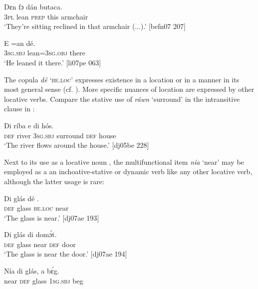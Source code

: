 \ea%
    \label{ex:key:935}
    \gll Dɛn      fɔ  dán  butaca.\\
\textsc{3pl}  lean    \textsc{prep}  this  armchair\\

\glt ‘They’re sitting reclined in that armchair (...).’ [befn07 207]\\
\z

\ea%
    \label{ex:key:936}
    \gll E    =an    dé.\\
\textsc{3sg.sbj}  lean=\textsc{3sg.obj}  there\\

\glt ‘He leaned it there.’ [li07pe 063]
\z

The copula \textit{dé} \textsc{‘be.loc’} expresses existence in a location or in a manner in its most general sense (cf. ). More specific nuances of location are expressed by other locative verbs. Compare the stative use of \textit{ráwn} ‘surround’ in the intransitive clause in :


\ea%
    \label{ex:key:937}
    \gll Di  ríba    e        di  hós.\\
\textsc{def}  river  \textsc{3sg.sbj}  surround  \textsc{def}  house\\

\glt ‘The river flows around the house.’ [dj05be 228]
\z

Next to its use as a locative noun , the multifunctional item \textit{nía} ‘near’ may be employed as a an inchoative-stative  or dynamic verb  like any other locative verb, although the latter usage is rare: 


\ea%
    \label{ex:key:938}
    \gll Di  glás    dé    .\\
\textsc{def}  glass  \textsc{be.loc}  near\\
\glt ‘The glass is near.’ [dj07ae 193]\\
\z

\ea%
    \label{ex:key:939}
    \gll Di  glás        di  domɔ́t.\\
\textsc{def}  glass  near    \textsc{def}  door\\

\glt ‘The glass is near the door.’ [dj07ae 194]
\z


\ea%
    \label{ex:key:940}
    \gll Nía    di  glás,    a    bɛ́g.\\
near    \textsc{def}  glass  \textsc{1sg.sbj}  beg\\

